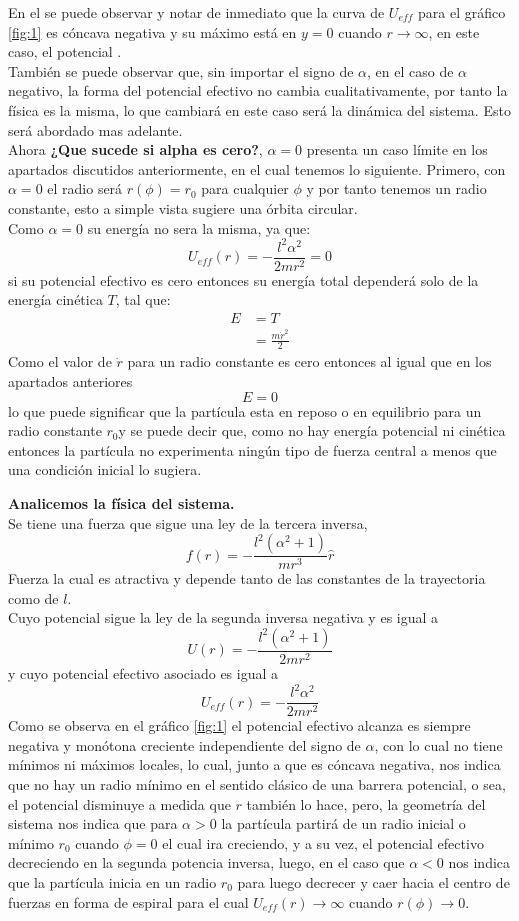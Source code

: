 \documentclass[../main.tex]{subfiles}
\begin{document}
En el se puede observar y notar de inmediato que la curva de $U_{eff}$ para el gráfico \ref{fig:1} es cóncava negativa y su máximo está en $y=0$ cuando $r\to \infty$, en este caso, el potencial . \\
También se puede observar que, sin importar el signo de $\alpha$, en el caso de $\alpha$ negativo, la forma del potencial efectivo no cambia cualitativamente, por tanto la física es la misma, lo que cambiará en este caso será la dinámica del sistema. Esto será abordado mas adelante.
\\
Ahora \textbf{¿Que sucede si alpha es cero?}, $\alpha=0$ presenta un caso límite en los apartados discutidos anteriormente, en el cual tenemos lo siguiente. Primero, con $\alpha=0$ el radio será $r(\phi)=r_0$ para cualquier $\phi$ y por tanto tenemos un radio constante, esto a simple vista sugiere una órbita circular.\\
Como $\alpha=0$ su energía no sera la misma, ya que:
$$U_{eff}(r)=-\frac{l^2\alpha^2}{2mr^2}=0$$
si su potencial efectivo es cero entonces su energía total dependerá solo de la energía cinética $T$, tal que:
\begin{align}
    E & =T \\
    & = \frac{m\dot{r}^2}{2}
\end{align}
Como el valor de $\dot{r}$ para un radio constante es cero entonces al igual que en los apartados anteriores
$$E=0$$
lo que puede significar que la partícula esta en reposo o en equilibrio para un radio constante $r_0$y se puede decir que, como no hay energía potencial ni cinética entonces la partícula no experimenta ningún tipo de fuerza central a menos que una condición inicial lo sugiera.

\textbf{Analicemos la física del sistema.} \\
Se tiene una fuerza que sigue una ley de la tercera inversa,
$$f(r)=-\frac{l^2(\alpha^2+1)}{m r^3}\hat{r}$$
Fuerza la cual es atractiva y depende tanto de las constantes de la trayectoria como de $l$. \\
Cuyo potencial sigue la ley de la segunda inversa negativa y es igual a
$$U(r)=-\frac{l^2(\alpha^2+1)}{2m r^2}$$
y cuyo potencial efectivo asociado es igual a
$$U_{eff}(r)=-\frac{l^2\alpha^2}{2m r^2}$$
Como se observa en el gráfico \ref{fig:1} el potencial efectivo alcanza es siempre negativa y monótona creciente independiente del signo de $\alpha$, con lo cual no tiene mínimos ni máximos locales, lo cual, junto a que es cóncava negativa, nos indica que no hay un radio mínimo en el sentido clásico de una barrera potencial, o sea, el potencial disminuye a medida que $r$ también lo hace, pero, la geometría del sistema nos indica que para $\alpha>0$ la partícula partirá de un radio inicial o mínimo $r_0$ cuando $\phi=0$ el cual ira creciendo, y a su vez, el potencial efectivo decreciendo en la segunda potencia inversa, luego, en el caso que $\alpha<0$ nos indica que la partícula inicia en un radio $r_0$ para luego decrecer y caer hacia el centro de fuerzas en forma de espiral para el cual $U_{eff}(r)\to \infty$ cuando $r(\phi)\to 0$.
\end{document}
